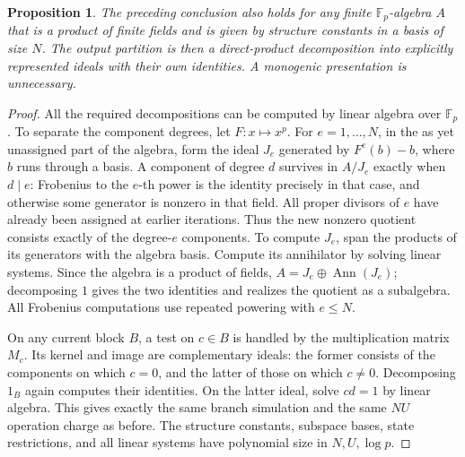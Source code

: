 \documentclass[11pt]{article}
\newtheorem{proposition}[theorem]{Proposition}
\theoremstyle{definition}
\theoremstyle{remark}
\begin{document}
\begin{proposition}\label{prop:structure-etale-simulation}
The preceding conclusion also holds for any finite \(\mathbb F_p\)-algebra
\(A\) that is a product of finite fields and is given by structure
constants in a basis of size \(N\). The output partition is then a
direct-product decomposition into explicitly represented ideals with
their own identities. A monogenic presentation is unnecessary.
\end{proposition}
\begin{proof}
All the required decompositions can be computed by linear algebra over
\(\mathbb F_p\). To separate the component degrees, let \(F:x\mapsto x^p\).
For \(e=1,\ldots,N\), in the as yet unassigned part of the algebra,
form the ideal \(J_e\) generated by \(F^e(b)-b\), where \(b\) runs through
a basis. A component of degree \(d\) survives in \(A/J_e\) exactly when
\(d\mid e\): Frobenius to the \(e\)-th power is the identity precisely
in that case, and otherwise some generator is nonzero in that field.
All proper divisors of \(e\) have already been assigned at earlier
iterations. Thus the new nonzero quotient consists exactly of the
degree-\(e\) components. To compute \(J_e\), span the products of its
generators with the algebra basis. Compute its annihilator by solving
linear systems. Since the algebra is a product of fields,
\(A=J_e\oplus\operatorname{Ann}(J_e)\); decomposing \(1\) gives the two
identities and realizes the quotient as a subalgebra. All Frobenius
computations use repeated powering with \(e\leq N\).

On any current block \(B\), a test on \(c\in B\) is handled by the
multiplication matrix \(M_c\). Its kernel and image are complementary
ideals: the former consists of the components on which \(c=0\), and the
latter of those on which \(c\ne0\). Decomposing \(1_B\) again computes
their identities. On the latter ideal, solve \(cd=1\) by linear algebra.
This gives exactly the same branch simulation and the same \(NU\)
operation charge as before. The structure constants, subspace bases,
state restrictions, and all linear systems have polynomial size in
\(N,U,\log p\).
\end{proof}
\end{document}
